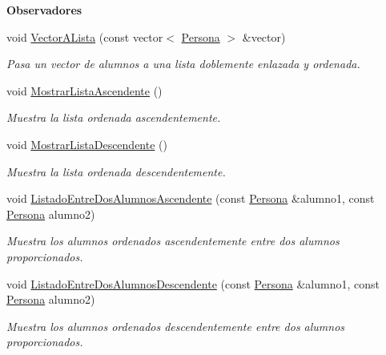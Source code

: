 \begin{Indent}{\bf Observadores}\par
\begin{DoxyCompactItemize}
\item 
void \hyperlink{classedi_1_1Asignatura_a646a84dca2c177d3084a551e044f0270}{Vector\+A\+Lista} (const vector$<$ \hyperlink{classedi_1_1Persona}{Persona} $>$ \&vector)
\begin{DoxyCompactList}\small\item\em Pasa un vector de alumnos a una lista doblemente enlazada y ordenada. \end{DoxyCompactList}\item 
\hypertarget{classedi_1_1Asignatura_afc4feb667482f5971b15bbf2b13d8f71}{void \hyperlink{classedi_1_1Asignatura_afc4feb667482f5971b15bbf2b13d8f71}{Mostrar\+Lista\+Ascendente} ()}\label{classedi_1_1Asignatura_afc4feb667482f5971b15bbf2b13d8f71}

\begin{DoxyCompactList}\small\item\em Muestra la lista ordenada ascendentemente. \end{DoxyCompactList}\item 
\hypertarget{classedi_1_1Asignatura_a8bb891db4bee8d5ee2220794c68565be}{void \hyperlink{classedi_1_1Asignatura_a8bb891db4bee8d5ee2220794c68565be}{Mostrar\+Lista\+Descendente} ()}\label{classedi_1_1Asignatura_a8bb891db4bee8d5ee2220794c68565be}

\begin{DoxyCompactList}\small\item\em Muestra la lista ordenada descendentemente. \end{DoxyCompactList}\item 
void \hyperlink{classedi_1_1Asignatura_ac866214296008a60bc07d1b154ccdc85}{Listado\+Entre\+Dos\+Alumnos\+Ascendente} (const \hyperlink{classedi_1_1Persona}{Persona} \&alumno1, const \hyperlink{classedi_1_1Persona}{Persona} alumno2)
\begin{DoxyCompactList}\small\item\em Muestra los alumnos ordenados ascendentemente entre dos alumnos proporcionados. \end{DoxyCompactList}\item 
void \hyperlink{classedi_1_1Asignatura_abc0935e033999909dc11e3bb4044bc0c}{Listado\+Entre\+Dos\+Alumnos\+Descendente} (const \hyperlink{classedi_1_1Persona}{Persona} \&alumno1, const \hyperlink{classedi_1_1Persona}{Persona} alumno2)
\begin{DoxyCompactList}\small\item\em Muestra los alumnos ordenados descendentemente entre dos alumnos proporcionados. \end{DoxyCompactList}\end{DoxyCompactItemize}
\end{Indent}

